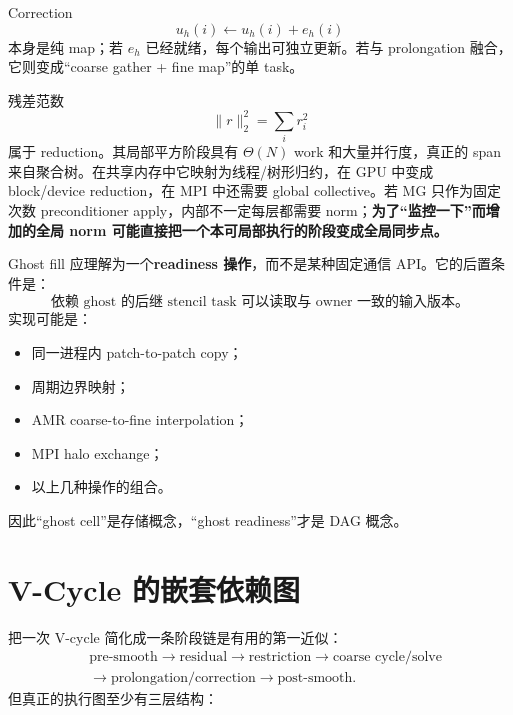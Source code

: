 Correction
\begin{equation}
u_h(i)\leftarrow u_h(i)+e_h(i)
\end{equation}
本身是纯 map；若 $e_h$ 已经就绪，每个输出可独立更新。若与 prolongation 融合，它则变成“coarse gather + fine map”的单 task。

残差范数
\begin{equation}
\|r\|_2^2=\sum_i r_i^2
\end{equation}
属于 reduction。其局部平方阶段具有 $\Theta(N)$ work 和大量并行度，真正的 span 来自聚合树。在共享内存中它映射为线程/树形归约，在 GPU 中变成 block/device reduction，在 MPI 中还需要 global collective。若 MG 只作为固定次数 preconditioner apply，内部不一定每层都需要 norm；\textbf{为了“监控一下”而增加的全局 norm 可能直接把一个本可局部执行的阶段变成全局同步点。}

Ghost fill 应理解为一个\textbf{readiness 操作}，而不是某种固定通信 API。它的后置条件是：
\begin{equation}
\boxed{
\text{依赖 ghost 的后继 stencil task 可以读取与 owner 一致的输入版本。}
}
\label{eq:mg-ghost-readiness}
\end{equation}
实现可能是：
\begin{itemize}
\item 同一进程内 patch-to-patch copy；
\item 周期边界映射；
\item AMR coarse-to-fine interpolation；
\item MPI halo exchange；
\item 以上几种操作的组合。
\end{itemize}
因此“ghost cell”是存储概念，“ghost readiness”才是 DAG 概念。

\section{V-Cycle 的嵌套依赖图}

把一次 V-cycle 简化成一条阶段链是有用的第一近似：
\begin{equation}
\boxed{
\begin{aligned}
&\text{pre-smooth}
\rightarrow
\text{residual}
\rightarrow
\text{restriction}
\rightarrow
\text{coarse cycle/solve}
\\
&\rightarrow
\text{prolongation/correction}
\rightarrow
\text{post-smooth}.
\end{aligned}
}
\label{eq:mg-parallel-vcycle-dag}
\end{equation}
但真正的执行图至少有三层结构：

